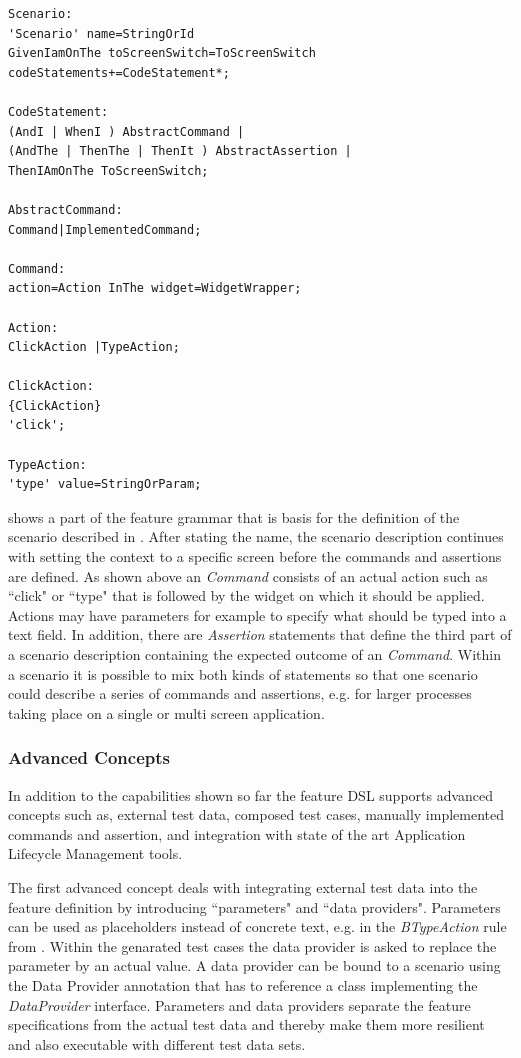 \documentclass{sig-alternate-05-2015}
\begin{document}
\begin{lstlisting}[captionpos=b, caption=Feature Grammar, label={lst:featureGrammar}, language=xtext]
Scenario:
'Scenario' name=StringOrId
GivenIamOnThe toScreenSwitch=ToScreenSwitch 
codeStatements+=CodeStatement*;

CodeStatement:
(AndI | WhenI ) AbstractCommand | 
(AndThe | ThenThe | ThenIt ) AbstractAssertion |   
ThenIAmOnThe ToScreenSwitch;

AbstractCommand:
Command|ImplementedCommand;

Command:
action=Action InThe widget=WidgetWrapper;

Action:
ClickAction |TypeAction;

ClickAction:
{ClickAction}
'click';

TypeAction:
'type' value=StringOrParam;
\end{lstlisting}

 shows a part of the feature grammar that is basis for the definition of the scenario described in .
After stating the name, the scenario description continues with setting the context to a specific screen before the commands and assertions are defined.
As shown above an \textit{Command} consists of an actual action such as ``click" or ``type" that is followed by the widget on which it should be applied.
Actions may have parameters for example to specify what should be typed into a text field. 
In addition, there are \textit{Assertion} statements that define the third part of a scenario description containing the expected outcome of an \textit{Command}.
Within a scenario it is possible to mix both kinds of statements so that one scenario could describe a series of commands and assertions, e.g. for larger processes taking place on a single or multi screen application.   

\subsubsection{Advanced Concepts}
In addition to the capabilities shown so far the feature DSL supports advanced concepts such as, external test data, composed test cases, manually implemented commands and assertion, and integration with state of the art Application Lifecycle Management tools.
 
The first advanced concept deals with integrating external test data into the feature definition by introducing ``parameters" and ``data providers".
Parameters can be used as placeholders instead of concrete text, e.g. in the \textit{BTypeAction} rule from .
Within the genarated test cases the data provider is asked to replace the parameter by an actual value.
A data provider can be bound to a scenario using the Data Provider annotation that has to reference a class implementing the \textit{DataProvider} interface.
Parameters and data providers separate the feature specifications from the actual test data and thereby make them more resilient and also executable with different test data sets.
\end{document}
